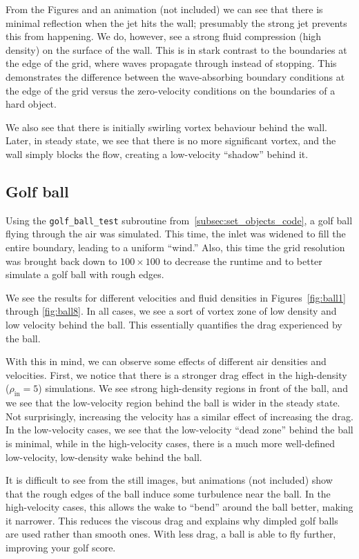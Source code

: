 \documentclass[twocolumn]{myarticle}
\numberwithin{equation}{section}
\begin{document}
From the Figures and an animation (not included) we can see that there is minimal reflection when the jet hits the wall; presumably the strong jet prevents this from happening.
We do, however, see a strong fluid compression (high density) on the surface of the wall.
This is in stark contrast to the boundaries at the edge of the grid, where waves propagate through instead of stopping.
This demonstrates the difference between the wave-absorbing boundary conditions at the edge of the grid versus the zero-velocity conditions on the boundaries of a hard object.

We also see that there is initially swirling vortex behaviour behind the wall.
Later, in steady state, we see that there is no more significant vortex, and the wall simply blocks the flow, creating a low-velocity ``shadow'' behind it.

\subsection{Golf ball}
\label{subsec:golf_ball}

Using the \texttt{golf\_ball\_test} subroutine from~\ref{subsec:set_objects_code}, a golf ball flying through the air was simulated.
This time, the inlet was widened to fill the entire boundary, leading to a uniform ``wind.''
Also, this time the grid resolution was brought back down to $ 100\times 100 $ to decrease the runtime and to better simulate a golf ball with rough edges.

We see the results for different velocities and fluid densities in Figures~\ref{fig:ball1} through \ref{fig:ball8}.
In all cases, we see a sort of vortex zone of low density and low velocity behind the ball.
This essentially quantifies the drag experienced by the ball.

With this in mind, we can observe some effects of different air densities and velocities.
First, we notice that there is a stronger drag effect in the high-density ($ \rho_\text{in} = 5 $) simulations.
We see strong high-density regions in front of the ball, and we see that the low-velocity region behind the ball is wider in the steady state.
Not surprisingly, increasing the velocity has a similar effect of increasing the drag.
In the low-velocity cases, we see that the low-velocity ``dead zone'' behind the ball is minimal, while in the high-velocity cases, there is a much more well-defined low-velocity, low-density wake behind the ball.

It is difficult to see from the still images, but animations (not included) show that the rough edges of the ball induce some turbulence near the ball.
In the high-velocity cases, this allows the wake to ``bend'' around the ball better, making it narrower.
This reduces the viscous drag and explains why dimpled golf balls are used rather than smooth ones.
With less drag, a ball is able to fly further, improving your golf score.
\end{document}
